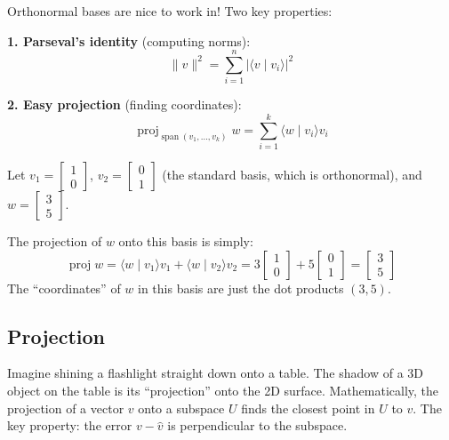 \documentclass[11pt]{article}
\theoremstyle{definition}
\theoremstyle{plain}
\theoremstyle{remark}
\DeclareMathOperator{\spn}{span}
\DeclareMathOperator{\proj}{proj}
\begin{document}
Orthonormal bases are nice to work in! Two key properties:

\textbf{1. Parseval's identity} (computing norms):
\[
\|v\|^2 = \sum_{i=1}^{n} |\langle v \mid v_i \rangle|^2
\]

\textbf{2. Easy projection} (finding coordinates):
\[
\proj_{\spn(v_1, \ldots, v_k)} w = \sum_{i=1}^{k} \langle w \mid v_i \rangle v_i
\]

\begin{workedexample}[title=\textbf{Worked Example: Projection onto an orthonormal basis}]
Let $v_1 = \begin{bmatrix}1\\0\end{bmatrix}$, $v_2 = \begin{bmatrix}0\\1\end{bmatrix}$ (the standard basis, which is orthonormal), and $w = \begin{bmatrix}3\\5\end{bmatrix}$.

The projection of $w$ onto this basis is simply:
\[
\proj w = \langle w \mid v_1 \rangle v_1 + \langle w \mid v_2 \rangle v_2 = 3\begin{bmatrix}1\\0\end{bmatrix} + 5\begin{bmatrix}0\\1\end{bmatrix} = \begin{bmatrix}3\\5\end{bmatrix}
\]
The ``coordinates'' of $w$ in this basis are just the dot products $(3, 5)$.
\end{workedexample}

\subsection{Projection}

\begin{intuitionbox}
Imagine shining a flashlight straight down onto a table. The shadow of a 3D object on the table is its ``projection'' onto the 2D surface. Mathematically, the projection of a vector $v$ onto a subspace $U$ finds the closest point in $U$ to $v$. The key property: the error $v - \hat{v}$ is perpendicular to the subspace.
\end{intuitionbox}
\end{document}
